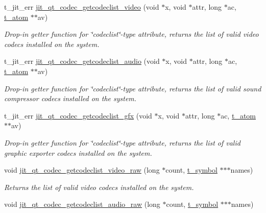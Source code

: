 \begin{DoxyCompactItemize}
\item 
t\_\-jit\_\-err \hyperlink{group__qtcodecmod_ga1a1524685c2ed9532370cdef0eb4b89d}{jit\_\-qt\_\-codec\_\-getcodeclist\_\-video} (void $\ast$x, void $\ast$attr, long $\ast$ac, \hyperlink{structt__atom}{t\_\-atom} $\ast$$\ast$av)
\begin{DoxyCompactList}\small\item\em Drop-\/in getter function for \char`\"{}codeclist\char`\"{}-\/type attribute, returns the list of valid video codecs installed on the system. \item\end{DoxyCompactList}\item 
t\_\-jit\_\-err \hyperlink{group__qtcodecmod_ga9bfde35355bacbb2c426c35d2366b81a}{jit\_\-qt\_\-codec\_\-getcodeclist\_\-audio} (void $\ast$x, void $\ast$attr, long $\ast$ac, \hyperlink{structt__atom}{t\_\-atom} $\ast$$\ast$av)
\begin{DoxyCompactList}\small\item\em Drop-\/in getter function for \char`\"{}codeclist\char`\"{}-\/type attribute, returns the list of valid sound compressor codecs installed on the system. \item\end{DoxyCompactList}\item 
t\_\-jit\_\-err \hyperlink{group__qtcodecmod_ga2909d3cefe4e70be15966899854f13d7}{jit\_\-qt\_\-codec\_\-getcodeclist\_\-gfx} (void $\ast$x, void $\ast$attr, long $\ast$ac, \hyperlink{structt__atom}{t\_\-atom} $\ast$$\ast$av)
\begin{DoxyCompactList}\small\item\em Drop-\/in getter function for \char`\"{}codeclist\char`\"{}-\/type attribute, returns the list of valid graphic exporter codecs installed on the system. \item\end{DoxyCompactList}\item 
void \hyperlink{group__qtcodecmod_gae6661384fe174c791b221987ad3e785f}{jit\_\-qt\_\-codec\_\-getcodeclist\_\-video\_\-raw} (long $\ast$count, \hyperlink{structt__symbol}{t\_\-symbol} $\ast$$\ast$$\ast$names)
\begin{DoxyCompactList}\small\item\em Returns the list of valid video codecs installed on the system. \item\end{DoxyCompactList}\item 
void \hyperlink{group__qtcodecmod_gab22a64fb0e7c3d795aefbbc473d5cb88}{jit\_\-qt\_\-codec\_\-getcodeclist\_\-audio\_\-raw} (long $\ast$count, \hyperlink{structt__symbol}{t\_\-symbol} $\ast$$\ast$$\ast$names)
$$
\end{DoxyCompactItemize}
